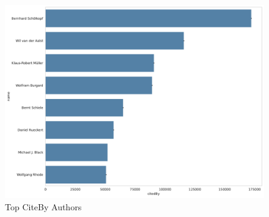 \begin{figure}
    \centering
    \includegraphics[width=0.8\linewidth]{figures/citeBy-top.pdf}
    \caption{Top CiteBy Authors}
    \label{fig:top-citeBy}
\end{figure}